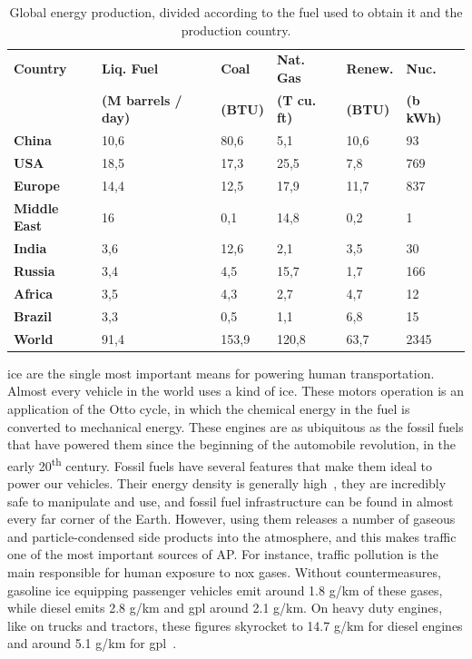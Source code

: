 \begin{table}[htpb]
    \centering
    \small
    \caption{Global energy production, divided according to the fuel
    used to obtain it and the production country.}
    \label{tab:global_energy_consumption}
    \begin{tabularx}{\textwidth}{lXXXXX}
    \toprule
    \textbf{Country} & \textbf{Liq. Fuel} &
    \textbf{Coal} & \textbf{Nat. Gas} &
    \textbf{Renew.} & \textbf{Nuc.} \\ 
                    &\textbf{\tiny{(M barrels /
    day)}}&\textbf{\tiny{(BTU)}}&\textbf{\tiny{(T cu.
                    ft)}}&\textbf{\tiny{(BTU)}}&\textbf{\tiny{(b kWh)}}\\\midrule
    \textbf{China} & 10,6 & 80,6 & 5,1 & 10,6 & 93 \\
    \textbf{USA} & 18,5 & 17,3 & 25,5 & 7,8 & 769 \\
    \textbf{Europe} & 14,4 & 12,5 & 17,9 & 11,7 & 837 \\
    \textbf{Middle East} & 16 & 0,1 & 14,8 & 0,2 & 1 \\
    \textbf{India} & 3,6 & 12,6 & 2,1 & 3,5 & 30 \\
    \textbf{Russia} & 3,4 & 4,5 & 15,7 & 1,7 & 166 \\
    \textbf{Africa} & 3,5 & 4,3 & 2,7 & 4,7 & 12 \\
    \textbf{Brazil} & 3,3 & 0,5 & 1,1 & 6,8 & 15 \\
    \textbf{World} & 91,4 & 153,9 & 120,8 & 63,7 & 2345 \\ \bottomrule
    \end{tabularx}
\end{table}

\gls{ice} are the single most important means for powering human
transportation. Almost every vehicle in the world uses a kind of
\gls{ice}. These motors operation is an application of the Otto cycle,
in which the chemical energy in the fuel is converted to mechanical
energy. These engines are as ubiquitous as the fossil fuels that have
powered them since the beginning of the automobile revolution, in the
early 20\textsuperscript{th} century. Fossil fuels have several features
that make them ideal to power our vehicles. Their energy density is
generally high~, they are incredibly safe to
manipulate and use, and fossil fuel infrastructure can be found in
almost every far corner of the Earth. However, using them releases a
number of gaseous and particle-condensed side products into the
atmosphere, and this makes traffic one of the most important sources of
\gls{AP}. For instance, traffic pollution is the main responsible for
human exposure to \gls{nox} gases. Without countermeasures, gasoline
\gls{ice} equipping passenger vehicles emit around 1.8 g/km of these
gases, while diesel emits 2.8 g/km and \gls{gpl} around 2.1 g/km. On
heavy duty engines, like on trucks and tractors, these figures skyrocket
to 14.7 g/km for diesel engines and around 5.1 g/km for
\gls{gpl}~\cite{CABI2019}.

